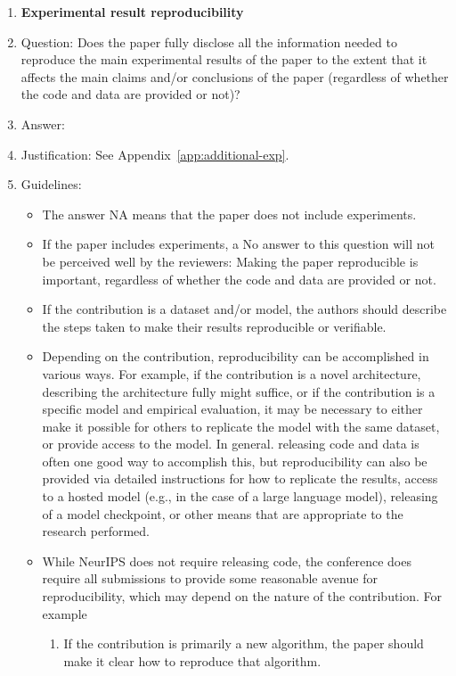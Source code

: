 \documentclass{article}
\theoremstyle{plain}
\theoremstyle{definition}
\theoremstyle{remark}
\begin{document}
\begin{enumerate}
    \item {\bf Experimental result reproducibility}
    \item[] Question: Does the paper fully disclose all the information needed to reproduce the main experimental results of the paper to the extent that it affects the main claims and/or conclusions of the paper (regardless of whether the code and data are provided or not)?
    \item[] Answer: \answerYes{} %
    \item[] Justification: See Appendix~\ref{app:additional-exp}.
    \item[] Guidelines:
    \begin{itemize}
        \item The answer NA means that the paper does not include experiments.
        \item If the paper includes experiments, a No answer to this question will not be perceived well by the reviewers: Making the paper reproducible is important, regardless of whether the code and data are provided or not.
        \item If the contribution is a dataset and/or model, the authors should describe the steps taken to make their results reproducible or verifiable. 
        \item Depending on the contribution, reproducibility can be accomplished in various ways. For example, if the contribution is a novel architecture, describing the architecture fully might suffice, or if the contribution is a specific model and empirical evaluation, it may be necessary to either make it possible for others to replicate the model with the same dataset, or provide access to the model. In general. releasing code and data is often one good way to accomplish this, but reproducibility can also be provided via detailed instructions for how to replicate the results, access to a hosted model (e.g., in the case of a large language model), releasing of a model checkpoint, or other means that are appropriate to the research performed.
        \item While NeurIPS does not require releasing code, the conference does require all submissions to provide some reasonable avenue for reproducibility, which may depend on the nature of the contribution. For example
        \begin{enumerate}
            \item If the contribution is primarily a new algorithm, the paper should make it clear how to reproduce that algorithm.

\end{enumerate}
\end{itemize}
\end{enumerate}
\end{document}
